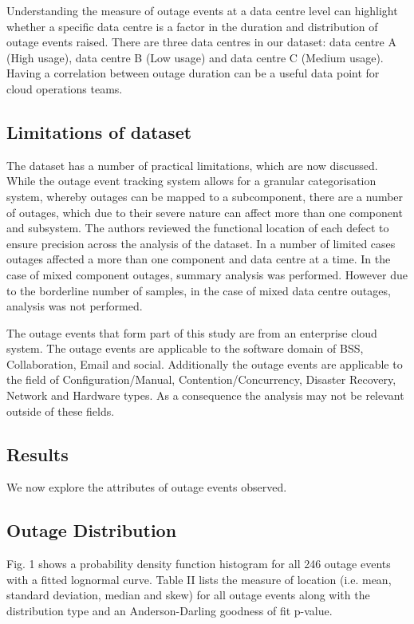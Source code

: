 Understanding the measure of outage events at a data centre level can highlight whether a specific data centre is a factor in the duration and distribution of outage events raised. There are three data centres in our dataset: data centre A (High usage), data centre B (Low usage) and data centre C (Medium usage). Having a correlation between outage duration can be a useful data point for cloud operations teams.

\subsection{Limitations of dataset}

The dataset has a number of practical limitations, which are now discussed. While the outage event tracking system allows for a granular categorisation system, whereby outages can be mapped to a subcomponent, there are a number of outages, which due to their severe nature can affect more than one component and subsystem. The authors reviewed the functional location of each defect to ensure precision across the analysis of the dataset. In a number of limited cases outages affected a more than one component and data centre at a time. In the case of mixed component outages, summary analysis was performed. However due to the borderline number of samples, in the case of mixed data centre outages, analysis was not performed. \par

The outage events that form part of this study are from an enterprise cloud system. The outage events are applicable to the software domain of BSS, Collaboration, Email and social. Additionally the outage events are applicable to the field of Configuration/Manual, Contention/Concurrency, Disaster Recovery, Network and Hardware types. As a consequence the analysis may not be relevant outside of these fields. 

\subsection{Results}

We now explore the attributes of outage events observed.

\subsection{Outage Distribution}

Fig. 1 shows a probability density function histogram for all 246 outage events with a fitted lognormal curve. 
Table II lists the measure of location (i.e. mean, standard deviation, median and skew) for all outage events along with the distribution type and an Anderson-Darling goodness of fit p-value.

